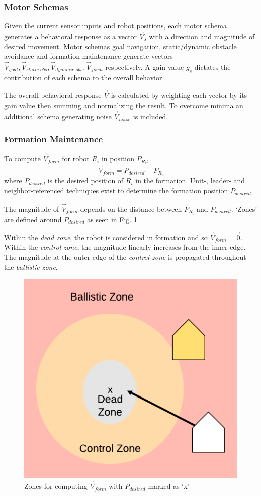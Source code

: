 \documentclass[letterpaper, 10 pt, conference]{ieeeconf}  %
\begin{document}
\subsubsection*{Motor Schemas}

Given the current sensor inputs and robot positions, each motor schema generates a behavioral response as a vector $\vec{V}_s$ with a direction and magnitude of desired movement. Motor schemas goal navigation, static/dynamic obstacle avoidance and formation maintenance generate vectors $\vec{V}_{goal}, \vec{V}_{static\_obs}, \vec{V}_{dynamic\_obs}, \vec{V}_{form}$ respectively. A gain value $g_s$ dictates the contribution of each schema to the overall behavior.  

The overall behavioral response $\vec{V}$ is calculated by weighting each vector by its gain value then summing and normalizing the result. To overcome minima an additional schema generating noise $\vec{V}_{noise}$ is included.

\subsubsection*{Formation Maintenance}

To compute $\vec{V}_{form}$ for robot $R_i$ in position $P_{R_i}$,
\[\vec{V}_{form} = P_{desired} - P_{R_i}\]
where $P_{desired}$ is the desired position of $R_i$ in the formation. 
Unit-, leader- and neighbor-referenced techniques exist to determine the formation position $P_{desired}$.

The magnitude of $\vec{V}_{form}$ depends on the distance between $P_{R_i}$ and $P_{desired}$. `Zones' are defined around $P_{desired}$ as seen in Fig. \ref{formation_zones}. 

Within the \textit{dead zone}, the robot is considered in formation and so $\vec{V}_{form} = \vec{0}$. Within the \textit{control zone}, the magnitude linearly increases from the inner edge. The magnitude at the outer edge of the \textit{control zone} is propagated throughout the \textit{ballistic zone}.

\begin{figure}[ht]
\centering
\includegraphics[width=0.45\linewidth]{images/formation_zones.png}
\caption{Zones for computing $\vec{V}_{form}$ with $P_{desired}$ marked as `x'}
\label{formation_zones}
\end{figure}
\end{document}
